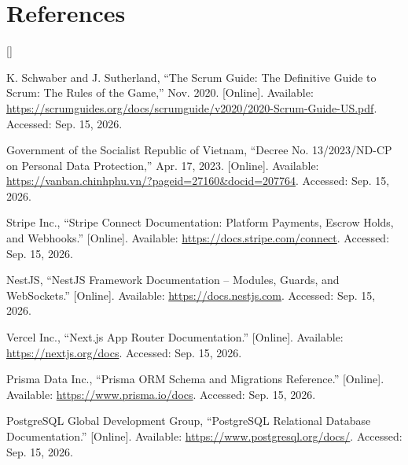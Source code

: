 \section{References}

\begin{list}{[]}{\leftmargin=1.2cm\itemsep=6pt\parsep=0pt}
\item K. Schwaber and J. Sutherland, ``The Scrum Guide: The Definitive Guide to Scrum: The Rules of the Game,'' Nov. 2020. [Online]. Available: \url{https://scrumguides.org/docs/scrumguide/v2020/2020-Scrum-Guide-US.pdf}. Accessed: Sep. 15, 2026.

\item Government of the Socialist Republic of Vietnam, ``Decree No. 13/2023/ND-CP on Personal Data Protection,'' Apr. 17, 2023. [Online]. Available: \url{https://vanban.chinhphu.vn/?pageid=27160&docid=207764}. Accessed: Sep. 15, 2026.

\item Stripe Inc., ``Stripe Connect Documentation: Platform Payments, Escrow Holds, and Webhooks.'' [Online]. Available: \url{https://docs.stripe.com/connect}. Accessed: Sep. 15, 2026.

\item NestJS, ``NestJS Framework Documentation -- Modules, Guards, and WebSockets.'' [Online]. Available: \url{https://docs.nestjs.com}. Accessed: Sep. 15, 2026.

\item Vercel Inc., ``Next.js App Router Documentation.'' [Online]. Available: \url{https://nextjs.org/docs}. Accessed: Sep. 15, 2026.

\item Prisma Data Inc., ``Prisma ORM Schema and Migrations Reference.'' [Online]. Available: \url{https://www.prisma.io/docs}. Accessed: Sep. 15, 2026.

\item PostgreSQL Global Development Group, ``PostgreSQL Relational Database Documentation.'' [Online]. Available: \url{https://www.postgresql.org/docs/}. Accessed: Sep. 15, 2026.
\end{list}
